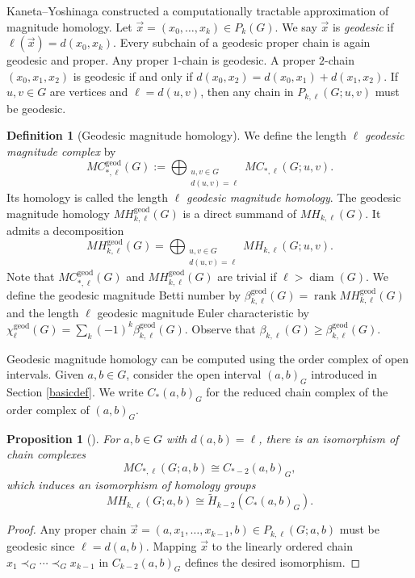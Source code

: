 \documentclass{amsart}
\numberwithin{equation}{section}
\newtheorem{prop}[thm]{Proposition}
\theoremstyle{plain}
\theoremstyle{remark}
\theoremstyle{definition}
\newtheorem{defn}[thm]{Definition}
\numberwithin{equation}{section}
\newcommand{\geod}{\mathrm{geod}}
\DeclareMathOperator{\rank}{rank}
\DeclareMathOperator{\diam}{diam}
\begin{document}
Kaneta--Yoshinaga \cite{Kaneta2021} constructed a computationally tractable approximation of magnitude homology.
Let $\Vec{x}=(x_0,\ldots,x_k)\in P_k(G)$. 
We say $\Vec{x}$ is \emph{geodesic} if $\ell(\Vec{x})=d(x_0,x_k)$. 
Every subchain of a geodesic proper chain is again geodesic and proper.
Any proper $1$-chain is geodesic.
A proper $2$-chain $(x_0,x_1,x_2)$ is geodesic if and only if $d(x_0,x_2)=d(x_0,x_1)+d(x_1,x_2)$.
If $u,v\in G$ are vertices and $\ell=d(u,v)$, then any chain in $P_{k,\ell}(G;u,v)$ must be geodesic. 

\begin{defn}[Geodesic magnitude homology]
We define the length $\ell$ \emph{geodesic magnitude complex} by
\[
MC_{*,\ell}^{\geod}(G):=\bigoplus_{\substack{u,v\in G\\ d(u,v)=\ell}}MC_{*,\ell}(G;u,v).
\]
Its homology is called the length $\ell$ \emph{geodesic magnitude homology}.
The geodesic magnitude homology $MH^{\geod}_{k,\ell}(G)$ is a direct summand of $MH_{k,\ell}(G)$.
It admits a decomposition
\[
MH_{k,\ell}^{\geod}(G)=\bigoplus_{\substack{u,v\in G\\ d(u,v)=\ell}}MH_{k,\ell}(G;u,v).
\]
Note that $MC_{*,\ell}^{\geod}(G)$ and $MH_{k,\ell}^{\geod}(G)$ are trivial if $\ell>\diam(G)$.
We define the geodesic magnitude Betti number by $\beta_{k,\ell}^{\geod}(G)=\rank MH_{k,\ell}^{\geod}(G)$ and the length $\ell$ geodesic magnitude Euler characteristic by $\chi_{\ell}^{\geod}(G)=\sum_{k}(-1)^k\beta_{k,\ell}^{\geod}(G)$. Observe that $\beta_{k,\ell}(G)\geq \beta_{k,\ell}^{\geod}(G)$.
\end{defn}

Geodesic magnitude homology can be computed using the order complex of open intervals.
Given $a,b\in G$, consider the open interval $(a,b)_G$ introduced in Section \ref{basicdef}.
We write $C_*(a,b)_G$ for the reduced chain complex of the order complex of $(a,b)_G$. 

\begin{prop}[{\cite[Proposition 2.3]{Gomi2025}}]\label{intervalMH}
    For $a,b\in G$ with $d(a,b)=\ell$, there is an isomorphism of chain complexes
    \[
    MC_{*,\ell}(G;a,b)\cong C_{*-2}(a,b)_G,
    \]
    which induces an isomorphism of homology groups
    \[
    MH_{k,\ell}(G;a,b)\cong\widetilde{H}_{k-2}(C_*(a,b)_G).
    \]
\end{prop}

\begin{proof}
    Any proper chain $\Vec{x}=(a,x_1,\ldots,x_{k-1},b)\in P_{k,\ell}(G;a,b)$ must be geodesic since $\ell=d(a,b)$.
    Mapping $\Vec{x}$ to the linearly ordered chain $x_1\prec_G\cdots\prec_G x_{k-1}$ in $C_{k-2}(a,b)_G$ defines the desired isomorphism.
\end{proof}
\end{document}
